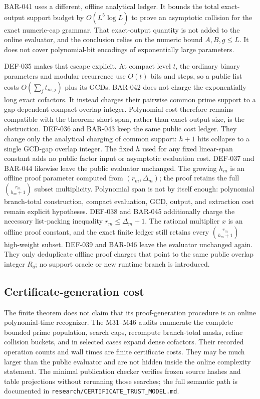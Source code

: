 \documentclass[11pt]{article}
\begin{document}
BAR-041 uses a different, offline analytical ledger. It bounds the total
exact-output support budget by \(O(L^5\log L)\) to prove an asymptotic
collision for the exact numeric-cap grammar. That exact-output quantity is
not added to the online evaluator, and the conclusion relies on the numeric
bound \(A,B,g\le L\). It does not cover polynomial-bit encodings of
exponentially large parameters.

DEF-035 makes that escape explicit. At compact level \(t\), the ordinary
binary parameters and modular recurrence use \(O(t)\) bits and steps, so a
public list costs \(O(\sum_jt_{m,j})\) plus its GCDs. BAR-042 does not charge
the exponentially long exact cofactors. It instead charges their pairwise
common prime support to a gap-dependent compact overlap integer. Polynomial
cost therefore remains compatible with the theorem; short span, rather than
exact output size, is the obstruction.
DEF-036 and BAR-043 keep the same public cost ledger. They change only the
analytical charging of common support: \(h+1\) hits collapse to a single
GCD-gap overlap integer. The fixed \(h\) used for any fixed linear-span
constant adds no public factor input or asymptotic evaluation cost.
DEF-037 and BAR-044 likewise leave the public evaluator unchanged.
The growing \(h_m\) is an offline proof parameter computed from
\((r_m,\Delta_m)\); the proof retains the full
\(\binom{r_m}{h_m+1}\) subset multiplicity. Polynomial span is not by itself
enough: polynomial branch-total construction, compact evaluation, GCD,
output, and extraction cost remain explicit hypotheses.
DEF-038 and BAR-045 additionally charge the necessary list-packing
inequality \(r_m\le\Delta_m+1\). The rational multiplier \(x\) is an
offline proof constant, and the exact finite ledger still retains every
\(\binom{r_m}{h_m+1}\) high-weight subset.
DEF-039 and BAR-046 leave the evaluator unchanged again. They only
deduplicate offline proof charges that point to the same public overlap
integer \(R_q\); no support oracle or new runtime branch is introduced.

\subsection{Certificate-generation cost}

The finite theorem does not claim that its proof-generation procedure is an
online polynomial-time recognizer. The M31--M46 audits enumerate the complete
bounded prime population, search caps, recompute branch-total masks, refine
collision buckets, and in selected cases expand dense cofactors. Their
recorded operation counts and wall times are finite certificate costs. They
may be much larger than the public evaluator and are not hidden inside the
online complexity statement. The minimal publication checker verifies
frozen source hashes and table projections without rerunning those searches;
the full semantic path is documented in
\texttt{research/CERTIFICATE\_TRUST\_MODEL.md}.
\end{document}

